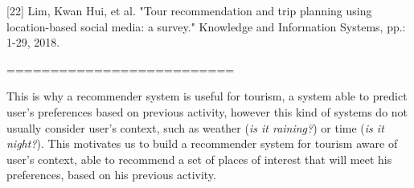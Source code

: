 [22] Lim, Kwan Hui, et al. "Tour recommendation and trip planning using location-based social media: a survey."
Knowledge and Information Systems, pp.: 1-29, 2018.

==========================


This is why a recommender system is useful for tourism, a system able to predict user's preferences based on previous activity, however this kind of systems do not usually consider user's context, such as weather (\textit{is it raining?}) or time (\textit{is it night?}). This motivates us to build a recommender system for tourism aware of user's context, able to recommend a set of places of interest that will meet his preferences, based on his previous activity.
